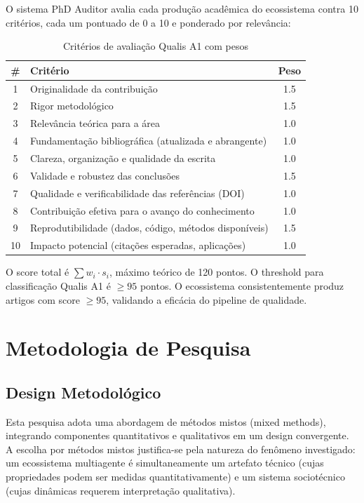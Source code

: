 \documentclass[12pt,a4paper,sumario=tradicional,openany]{abntex2}
\begin{document}
O sistema PhD Auditor avalia cada produção acadêmica do ecossistema contra 10 critérios, cada um pontuado de 0 a 10 e ponderado por relevância:

\begin{table}[H]
\centering
\caption{Critérios de avaliação Qualis A1 com pesos}
\label{tab:qualis-a1}
\begin{tabular}{@{}clc@{}}
\toprule
\textbf{\#} & \textbf{Critério} & \textbf{Peso} \\
\midrule
1 & Originalidade da contribuição & 1.5 \\
2 & Rigor metodológico & 1.5 \\
3 & Relevância teórica para a área & 1.0 \\
4 & Fundamentação bibliográfica (atualizada e abrangente) & 1.0 \\
5 & Clareza, organização e qualidade da escrita & 1.0 \\
6 & Validade e robustez das conclusões & 1.5 \\
7 & Qualidade e verificabilidade das referências (DOI) & 1.0 \\
8 & Contribuição efetiva para o avanço do conhecimento & 1.0 \\
9 & Reprodutibilidade (dados, código, métodos disponíveis) & 1.5 \\
10 & Impacto potencial (citações esperadas, aplicações) & 1.0 \\
\bottomrule
\end{tabular}
\end{table}

O score total é $\sum w_i \cdot s_i$, máximo teórico de 120 pontos. O threshold para classificação Qualis A1 é $\geq 95$ pontos. O ecossistema consistentemente produz artigos com score $\geq 95$, validando a eficácia do pipeline de qualidade.

\chapter{Metodologia de Pesquisa}

\section{Design Metodológico}

Esta pesquisa adota uma abordagem de métodos mistos (mixed methods), integrando componentes quantitativos e qualitativos em um design convergente. A escolha por métodos mistos justifica-se pela natureza do fenômeno investigado: um ecossistema multiagente é simultaneamente um artefato técnico (cujas propriedades podem ser medidas quantitativamente) e um sistema sociotécnico (cujas dinâmicas requerem interpretação qualitativa).
\end{document}
